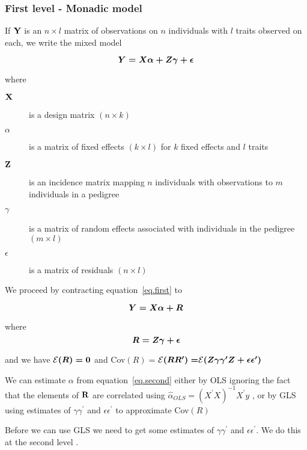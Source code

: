 \documentclass[titlepage]{article}  %
\begin{document}
\subsubsection{First level - Monadic model}
If $\bf Y$ is an $n \times l$ matrix of observations on $n$ individuals with $l$ traits observed on each, we write the mixed model

\begin{equation}
\mbox{\boldmath $Y = X\alpha + Z\gamma + \epsilon$}  \label{eq.first}
\end{equation}

where 
\begin{description}
\item[$\bf X$] is a design matrix $(n \times k)$
\item[\boldmath $\alpha$] is a matrix of fixed effects $(k \times l)$ for $k$ fixed effects and $l$ traits
\item[$\bf Z$] is an incidence matrix mapping $n$ individuals with observations to $m$ individuals in a pedigree
\item[\boldmath $\gamma$] is a matrix of random effects associated with individuals in the pedigree $(m \times l)$
\item[\boldmath $\epsilon$] is a matrix of residuals $(n \times l)$
\end{description}
 
We proceed by contracting equation~\ref{eq.first} to 

\begin{equation}
\mbox{\boldmath $Y = X\alpha + R$}   \label{eq.second}
\end{equation}

where
\begin{displaymath}
\mbox{\boldmath $ R = Z\gamma + \epsilon$} 
\end{displaymath}

and we have ${\cal E}\mbox{\boldmath $(R) = 0$}$ and Cov\mbox{\boldmath $(R) = $}${\cal E}\mbox{\boldmath $(R R^{\prime}) = $}{\cal E}\mbox{\boldmath $(Z \gamma \gamma^{\prime} Z + \epsilon \epsilon^{\prime})$}$

We can estimate \boldmath $\alpha$ from equation~\ref{eq.second} either by OLS ignoring the fact that the elements of $\bf R$ are correlated using \boldmath $\hat{\alpha}_{OLS} = (X^{\prime}X)^{-1}X^{\prime}y$ , or by GLS using estimates of $\gamma \gamma^{\prime}$ and $\epsilon \epsilon^{\prime}$ to approximate Cov\mbox{\boldmath $(R)$}

Before we can use GLS we need to get some estimates of $\gamma \gamma^{\prime}$ and $\epsilon \epsilon^{\prime}$. We do this at the second level .
\end{document}
